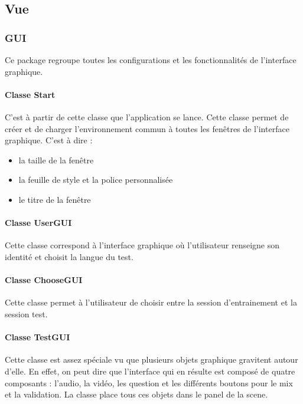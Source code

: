 \subsection{Vue}


\subsubsection{GUI}

Ce package regroupe toutes les configurations et les fonctionnalités de l'interface graphique.

\paragraph{Classe Start}

C'est à partir de cette classe que l'application se lance.
Cette classe permet de créer et de charger l'environnement commun à toutes les fenêtres de l'interface graphique. C'est à dire :
\begin{itemize}
 \item la taille de la fenêtre
 \item la feuille de style  et la police personnalisée
 \item le titre de la fenêtre
\end{itemize}


\paragraph{Classe UserGUI}

Cette classe correspond à l'interface graphique où l'utilisateur renseigne son identité et choisit la langue du test.

\paragraph{Classe ChooseGUI}

Cette classe permet à l'utilisateur de choisir entre la session d'entrainement et la session test.

\paragraph{Classe TestGUI}

Cette classe est assez spéciale vu que plusieurs objets graphique gravitent autour d'elle. En effet, on peut dire que l'interface qui en résulte est composé de quatre composants : l'audio, la vidéo, les question et les différents boutons pour le mix et la validation. La classe place tous ces objets dans le panel de la scene. 


